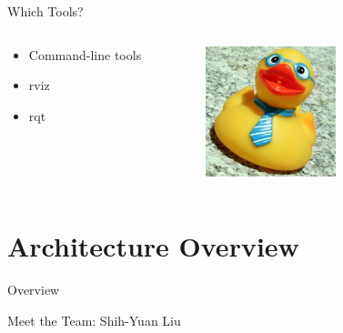\documentclass[aspectratio=43]{beamer}
\begin{document}
\begin{frame}{Which Tools?}
\begin{columns}
	\begin{column}{0.55\textwidth}
		\begin{itemize}
			\item Command-line tools
                          \item rviz
                          \item rqt
		\end{itemize} 
        \end{column} 
        \begin{column}{0.45\textwidth} 
          \centering 
          \includegraphics[width=0.5\textwidth]{fig/yay-duckie.jpg} 
        \end{column}
\end{columns}

\end{frame}


\section{Architecture Overview}
\begin{frame}[label=overview]{Overview}
	\tableofcontents[sectionstyle=show/shaded,subsectionstyle=show/shaded/shaded]
\end{frame}

\begin{frame}{Meet the Team: Shih-Yuan Liu}
\end{frame}

\begin{frame}
\end{frame}
\end{document}

